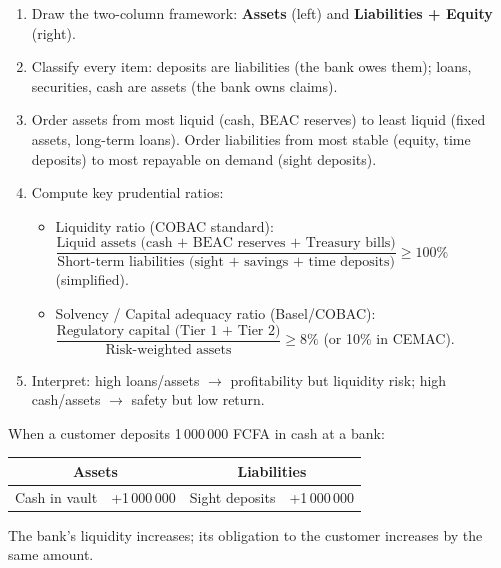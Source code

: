 \documentclass[11pt]{article}
\newcommand{\cle}[1]{{\popxbold\color{popdark}#1}}
\begin{document}
\begin{methode}
\begin{enumerate}
\item Draw the two-column framework: \textbf{Assets} (left) and \textbf{Liabilities + Equity} (right).
\item Classify every item: deposits are liabilities (the bank owes them); loans, securities, cash are assets (the bank owns claims).
\item Order assets from most liquid (cash, BEAC reserves) to least liquid (fixed assets, long-term loans). Order liabilities from most stable (equity, time deposits) to most repayable on demand (sight deposits).
\item Compute key prudential ratios:
\begin{itemize}
\item \cle{Liquidity ratio} (COBAC standard): $\dfrac{\text{Liquid assets (cash + BEAC reserves + Treasury bills)}}{\text{Short-term liabilities (sight + savings + time deposits)}} \ge 100\%$ (simplified).
\item \cle{Solvency / Capital adequacy ratio} (Basel/COBAC): $\dfrac{\text{Regulatory capital (Tier 1 + Tier 2)}}{\text{Risk-weighted assets}} \ge 8\%$ (or 10\% in CEMAC).
\end{itemize}
\item Interpret: high loans/assets $\rightarrow$ profitability but liquidity risk; high cash/assets $\rightarrow$ safety but low return.
\end{enumerate}
\end{methode}

\begin{exemplebox}
When a customer deposits 1\,000\,000 FCFA in cash at a bank:
\begin{center}
\begin{tabular}{|l|r|l|r|}
\hline
\multicolumn{2}{|c|}{\textbf{Assets}} & \multicolumn{2}{c|}{\textbf{Liabilities}} \\
\hline
Cash in vault & +1\,000\,000 & Sight deposits & +1\,000\,000 \\
\hline
\end{tabular}
\end{center}
The bank's liquidity increases; its obligation to the customer increases by the same amount.
\end{exemplebox}
\end{document}
